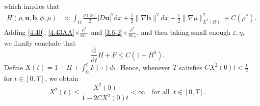 \documentclass[11pt]{article}
\numberwithin{equation}{section}
\begin{document}
which implies that
\begin{equation*}
\begin{split}\label{4.20}
H(\rho,\mathbf{u},\mathbf{b},\phi,\mu)&
\approx\int_{\Omega}\frac{\nu(\phi)}{2}|D\mathbf{u}|^2\mathrm{d}x
+\frac{1}{2}\|\nabla\mathbf{b}\|^2\mathrm{d}x+\frac{1}{2}\|\nabla\mu\|_{L^2(\Omega)}^2+C(\rho^*).
\end{split}
\end{equation*}
Adding \eqref{4.40}, \eqref{4.43AA}$\times \frac{\rho^*}{8C_1}$ and  \eqref{3.6-2}$\times \frac{\rho^*}{8C_2}$, and then
taking  small enough $\varepsilon,\eta$,
we finally conclude that
\begin{equation}\label{4.58}
\frac{\mathrm{d}}{\mathrm{d}t}H + F \leq C(1+H^3).
\end{equation}
Define $X(t)=1+H + \int_{0}^{t}F(\tau)d\tau.$ Hence, whenever $T$ satisfies  $CX^{2}(0)t<\frac{1}{2}$ for  $t\in [0,T]$, we obtain
\begin{equation*}\label{3.10-1-A} X^{2}(t)\leq\frac{X^{2}(0)}{1-2CX^{2}(0)t}< \infty\quad \text{for all }\  t\in [0,T].\end{equation*}


\end{document}
